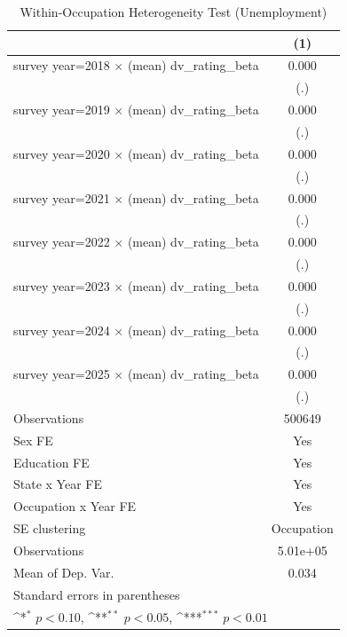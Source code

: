 \begin{table}[htbp]\centering
\def\sym#1{\ifmmode^{#1}\else\(^{#1}\)\fi}
\caption{Within-Occupation Heterogeneity Test (Unemployment)}
\begin{tabular}{l*{1}{c}}
\hline\hline
                &\multicolumn{1}{c}{(1)}         \\
\hline
survey year=2018 $\times$ (mean) dv\_rating\_beta&    0.000         \\
                &      (.)         \\
[1em]
survey year=2019 $\times$ (mean) dv\_rating\_beta&    0.000         \\
                &      (.)         \\
[1em]
survey year=2020 $\times$ (mean) dv\_rating\_beta&    0.000         \\
                &      (.)         \\
[1em]
survey year=2021 $\times$ (mean) dv\_rating\_beta&    0.000         \\
                &      (.)         \\
[1em]
survey year=2022 $\times$ (mean) dv\_rating\_beta&    0.000         \\
                &      (.)         \\
[1em]
survey year=2023 $\times$ (mean) dv\_rating\_beta&    0.000         \\
                &      (.)         \\
[1em]
survey year=2024 $\times$ (mean) dv\_rating\_beta&    0.000         \\
                &      (.)         \\
[1em]
survey year=2025 $\times$ (mean) dv\_rating\_beta&    0.000         \\
                &      (.)         \\
\hline
Observations    &   500649         \\
Sex FE          &      Yes         \\
Education FE    &      Yes         \\
State x Year FE &      Yes         \\
Occupation x Year FE&      Yes         \\
SE clustering   &Occupation         \\
Observations    & 5.01e+05         \\
Mean of Dep. Var.&    0.034         \\
\hline\hline
\multicolumn{2}{l}{\footnotesize Standard errors in parentheses}\\
\multicolumn{2}{l}{\footnotesize \sym{*} \(p<0.10\), \sym{**} \(p<0.05\), \sym{***} \(p<0.01\)}\\
\end{tabular}
\end{table}
